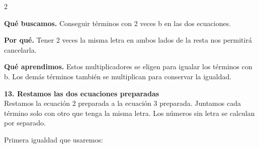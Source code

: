 \documentclass[11pt,a4paper,landscape]{article}
\begin{document}
\begin{multicols*}{2}
\begin{minipage}{\linewidth}
\par\smallskip\textbf{Qué buscamos.} Conseguir términos con 2 veces b en las dos ecuaciones.
\par\smallskip\textbf{Por qué.} Tener 2 veces la misma letra en ambos lados de la resta nos permitirá cancelarla.
\par{}\par\smallskip
\par\smallskip\textbf{Qué aprendimos.} Estos multiplicadores se eligen para igualar los términos con b. Los demás términos también se multiplican para conservar la igualdad.
\end{minipage}\par\medskip
\noindent\begin{minipage}{\linewidth}\textbf{13. Restamos las dos ecuaciones preparadas}\\[2pt]Restamos la ecuación 2 preparada a la ecuación 3 preparada. Juntamos cada término solo con otro que tenga la misma letra. Los números sin letra se calculan por separado.
\par{}\par\smallskip
\par\smallskip Primera igualdad que usaremos:

\end{minipage}
\end{multicols*}
\end{document}
